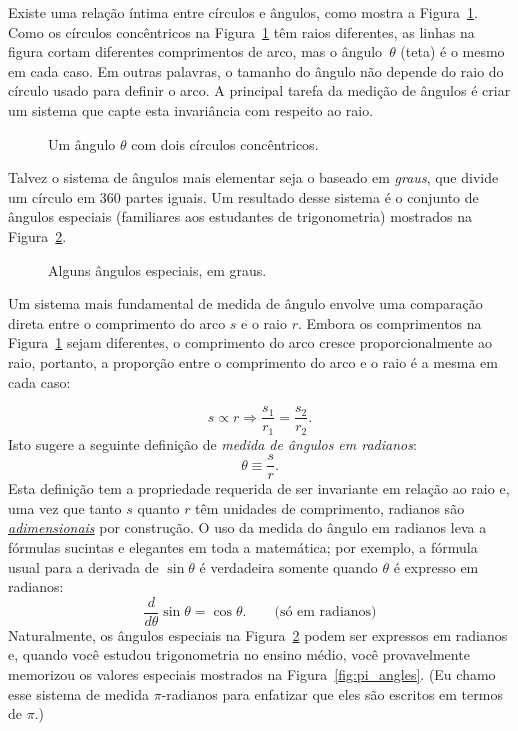 Existe uma relação íntima entre círculos e ângulos, como mostra a Figura~\ref{fig:angle_arclength}. Como os círculos concêntricos na Figura~\ref{fig:angle_arclength} têm raios diferentes, as linhas na figura cortam diferentes comprimentos de arco, mas o ângulo~$\theta$ (teta) é o mesmo em cada caso. Em outras palavras, o tamanho do ângulo não depende do raio do círculo usado para definir o arco. A principal tarefa da medição de ângulos é criar um sistema que capte esta invariância com respeito ao raio.

\begin{figure}
\begin{center}
\end{center}
\caption{Um ângulo $\theta$ com dois círculos concêntricos.\label{fig:angle_arclength}}
\end{figure}

Talvez o sistema de ângulos mais elementar seja o baseado em \emph{graus}, que divide um círculo em 360 partes iguais. Um resultado desse sistema é o conjunto de ângulos especiais (familiares aos estudantes de trigonometria) mostrados na Figura~\ref{fig:degree_angles}.

\begin{figure}
\begin{center}
\end{center}
\caption{Alguns ângulos especiais, em graus.\label{fig:degree_angles}}
\end{figure}

Um sistema mais fundamental de medida de ângulo envolve uma comparação direta entre o comprimento do arco $s$ e o raio $r$. Embora os comprimentos na Figura~\ref{fig:angle_arclength} sejam diferentes, o comprimento do arco cresce proporcionalmente ao raio, portanto, a proporção entre o comprimento do arco e o raio é a mesma em cada caso:

\[
s\propto r \Rightarrow \frac{s_1}{r_1} = \frac{s_2}{r_2}.
\]
Isto sugere a seguinte definição de \emph{medida de ângulos em radianos}:
\begin{equation}
\label{eq:radians}
\theta \equiv \frac{s}{r}.
\end{equation}
Esta definição tem a propriedade requerida de ser invariante em relação ao raio e, uma vez que tanto $s$ quanto $r$ têm unidades de comprimento, radianos são \href{https://pt.wikipedia.org/wiki/Magnitude_adimensional}{\emph{adimensionais}} por construção. O uso da medida do ângulo em radianos leva a fórmulas sucintas e elegantes em toda a matemática; por exemplo, a fórmula usual para a derivada de $\sin\theta$ é verdadeira somente quando $\theta$ é expresso em radianos:
\[
  \frac{d}{d\theta}\sin\theta = \cos\theta. \qquad\mbox{(só em radianos)}
\]
Naturalmente, os ângulos especiais na Figura~\ref{fig:degree_angles} podem ser expressos em radianos e, quando você estudou trigonometria no ensino médio, você provavelmente memorizou os valores especiais mostrados na Figura~\ref{fig:pi_angles}. (Eu chamo esse sistema de medida $\pi$-radianos para enfatizar que eles são escritos em termos de $\pi$.)


